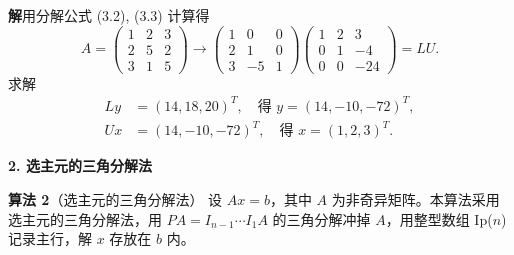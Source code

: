 \documentclass[a4paper,12pt]{ctexart}
\theoremstyle{exampleStyle}
\newcommand{\solution}{\par\noindent\textbf{解}\quad}
\begin{document}
\solution 用分解公式 (3.2), (3.3) 计算得
\[
A = \begin{pmatrix} 1 & 2 & 3 \\ 2 & 5 & 2 \\ 3 & 1 & 5 \end{pmatrix} \xrightarrow{} \begin{pmatrix} 1 & 0 & 0 \\ 2 & 1 & 0 \\ 3 & -5 & 1 \end{pmatrix} \begin{pmatrix} 1 & 2 & 3 \\ 0 & 1 & -4 \\ 0 & 0 & -24 \end{pmatrix} = LU.
\]
求解
\begin{align*}
Ly &= (14, 18, 20)^T, \quad \text{得 } y = (14, -10, -72)^T, \\
Ux &= (14, -10, -72)^T, \quad \text{得 } x = (1, 2, 3)^T.
\end{align*}

\vspace{1em}
\noindent\textbf{2. 选主元的三角分解法}

\textbf{算法 2}（选主元的三角分解法） 设 $Ax = b$，其中 $A$ 为非奇异矩阵。本算法采用选主元的三角分解法，用 $PA = I_{n-1} \cdots I_1 A$ 的三角分解冲掉 $A$，用整型数组 Ip($n$) 记录主行，解 $x$ 存放在 $b$ 内。
\end{document}
